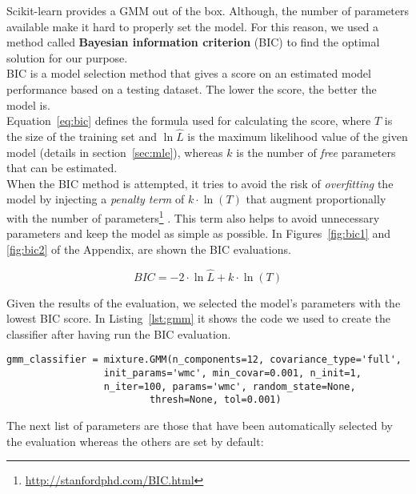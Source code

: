 \noindent Scikit-learn provides a GMM out of the box. Although, the number of parameters available make it hard to properly set the model. For this reason, we used a method called \textbf{Bayesian information criterion} (BIC) to find the optimal solution for our purpose. \\

\noindent BIC is a model selection method that gives a score on an estimated model performance based on a testing dataset. The lower the score, the better the model is. \\
\noindent Equation~\ref{eq:bic} defines the formula used for calculating the score, where $T$ is the size of the training set and $\ln{\hat L}$ is the maximum likelihood value of the given model (details in section~\ref{sec:mle}), whereas $k$ is the number of \textit{free} parameters that can be estimated. \\
\noindent When the BIC method is attempted, it tries to avoid the risk of \textit{overfitting} the model by injecting a \textit{penalty term} of $k \cdot \ln(T)$ that augment proportionally with the number of parameters\footnote{\url{http://stanfordphd.com/BIC.html}} \cite{chen1998speaker}. This term also helps to avoid unnecessary parameters and keep the model as simple as possible. In Figures~\ref{fig:bic1} and \ref{fig:bic2} of the Appendix, are shown the BIC evaluations.

\begin{equation}
\label{eq:bic}
	 BIC = -2 \cdot \ln{\hat L} + k \cdot \ln(T)
\end{equation}

\noindent Given the results of the evaluation, we selected the model's parameters with the lowest BIC score. In Listing~\ref{lst:gmm} it shows the code we used to create the classifier after having run the BIC evaluation.

\begin{lstlisting}[caption={Parameters of GMM classifier},label={lst:gmm}, style=BashInputStyle]
gmm_classifier = mixture.GMM(n_components=12, covariance_type='full',
			     init_params='wmc', min_covar=0.001, n_init=1,
			     n_iter=100, params='wmc', random_state=None,
	                     thresh=None, tol=0.001)
\end{lstlisting}

\clearpage

\noindent The next list of parameters are those that have been automatically selected by the evaluation whereas the others are set by default:

